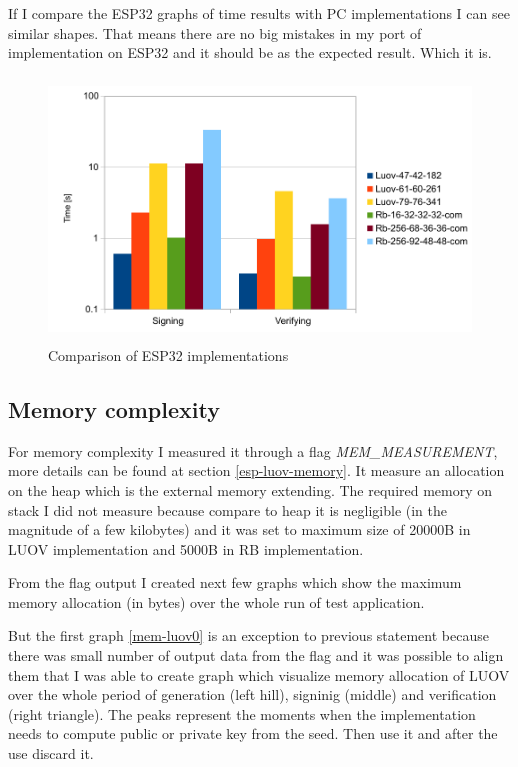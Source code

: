 \documentclass[thesis=M,english]{FITthesis}[2019/12/23]
\begin{document}
\bigskip
\noindent
If I compare the ESP32 graphs of time results with PC implementations I can see similar shapes. That means there are no big mistakes in my port of implementation on ESP32 and it should be as the expected result. Which it is.

\begin{figure}[H]
\centering
\includegraphics[width=13cm,height=7cm]{images/time-both.pdf}
\caption{Comparison of ESP32 implementations}
\label{time-both}
\end{figure}

\subsection{Memory complexity}
For memory complexity I measured it through a flag \textit{MEM\_MEASUREMENT}, more details can be found at section \ref{esp-luov-memory}. It measure an allocation on the heap which is the external memory extending. The required memory on stack I did not measure because compare to heap it is negligible (in the magnitude of a few kilobytes) and it was set to maximum size of 20000B in LUOV implementation and 5000B in RB implementation.

\bigskip
\noindent
From the flag output I created next few graphs which show the maximum memory allocation (in bytes) over the whole run of test application.

\bigskip
\noindent
But the first graph \ref{mem-luov0} is an exception to previous statement because there was small number of output data from the flag and it was possible to align them that I was able to create graph which visualize memory allocation of LUOV over the whole period of generation (left hill), signinig (middle) and verification (right triangle). The peaks represent the moments when the implementation needs to compute public or private key from the seed. Then use it and after the use discard it.
\end{document}
